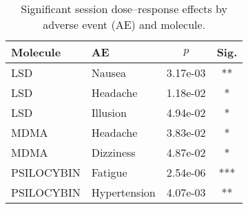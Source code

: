 \begin{table}[htbp]
  \centering
  \caption{Significant session dose--response effects by adverse event (AE) and molecule.}
  \label{tab:dr-ae-by-molecule-session}
  \begin{tabular}{llcc}
    \toprule
    Molecule & AE & $p$ & Sig. \\
    \midrule
    LSD & Nausea & 3.17e-03 & ** \\
    LSD & Headache & 1.18e-02 & * \\
    LSD & Illusion & 4.94e-02 & * \\
    MDMA & Headache & 3.83e-02 & * \\
    MDMA & Dizziness & 4.87e-02 & * \\
    PSILOCYBIN & Fatigue & 2.54e-06 & *** \\
    PSILOCYBIN & Hypertension & 4.07e-03 & ** \\
    \bottomrule
  \end{tabular}
\end{table}
